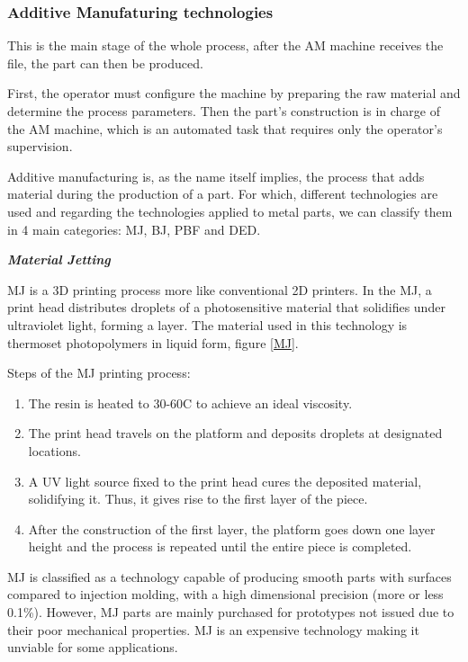 \subsubsection{Additive Manufaturing technologies}

This is the main stage of the whole process, after the AM machine receives the file, the part can then be produced.\par
First, the operator must configure the machine by preparing the raw material and determine the process parameters. Then the part's construction is in charge of the AM machine, which is an automated task that requires only the operator's supervision.\par
Additive manufacturing is, as the name itself implies, the process that adds material during the production of a part. For which, different technologies are used and regarding the technologies applied to metal parts, we can classify them in 4 main categories: \ac{MJ}, \ac{BJ}, \ac{PBF} and \ac{DED}.

\vspace{10}

\textbf{\emph{Material Jetting}}\par
\vspace{10}

\ac{MJ} is a 3D printing process more like conventional 2D printers. In the \ac{MJ}, a print head distributes droplets of a photosensitive material that solidifies under ultraviolet light, forming a layer\cite{lboro}. The material used in this technology is thermoset photopolymers in liquid form, figure \ref{MJ}.\par
Steps of the \ac{MJ} printing process:
\begin{enumerate}
    \item The resin is heated to 30-60C to achieve an ideal viscosity\cite{3dhubs}.
    \item The print head travels on the platform and deposits droplets at designated locations\cite{3dhubs}.
    \item A UV light source fixed to the print head cures the deposited material, solidifying it. Thus, it gives rise to the first layer of the piece\cite{3dhubs}.
    \item After the construction of the first layer, the platform goes down one layer height and the process is repeated until the entire piece is completed\cite{3dhubs}.
\end{enumerate}
\ac{MJ} is classified as a technology capable of producing smooth parts with surfaces compared to injection molding, with a high dimensional precision (more or less 0.1\%)\cite{3dhubs,lboro}. However, MJ parts are mainly purchased for prototypes not issued due to their poor mechanical properties. MJ is an expensive technology making it unviable for some applications\cite{lboro,3dhubs}.

